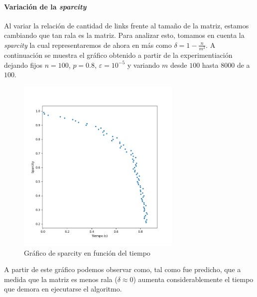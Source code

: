 
\paragraph{Variaci\'on de la \textit{sparcity}}
Al variar la relaci\'on de cantidad de links frente al tama\~no de la matriz, estamos cambiando que tan rala es la matriz. Para analizar esto,
tomamos en cuenta la \textit{sparcity} la cual representaremos de ahora en m\'as como $\delta = 1 - \frac{n}{m^2}$. A continuaci\'on se muestra 
el gr\'afico obtenido a partir de la experimentiaci\'on dejando fijos $n = 100$, $p = 0.8$, $\varepsilon = 10^{-5}$ y variando $m$ desde $100$
hasta $8000$ de a $100$.
\begin{figure}[H] 
\centering
\includegraphics[width=0.7\textwidth]{img/sparcity.png}
\caption{Gr\'afico de sparcity en funci\'on del tiempo}
\label{fig:sparcity}
\end{figure}
A partir de este gr\'afico podemos observar como, tal como fue predicho, que a medida que la matriz es menos rala ($\delta \approx 0$) aumenta
considerablemente el tiempo que demora en ejecutarse el algoritmo.


